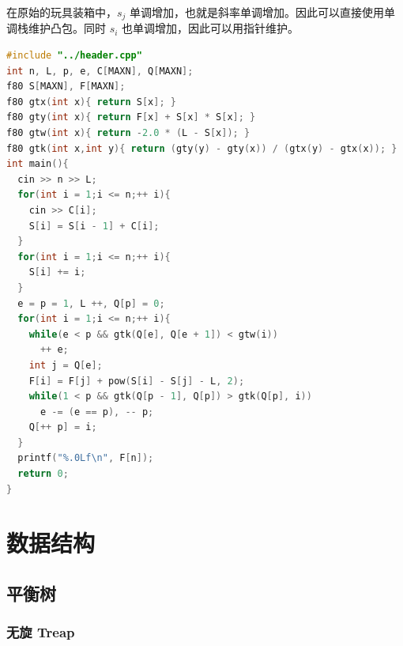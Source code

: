 \documentclass[10pt]{ctexart}
\begin{document}
\begin{multicols}{3}
    在原始的玩具装箱中，\(s_j\)
    单调增加，也就是斜率单调增加。因此可以直接使用单调栈维护凸包。同时
    \(s_i\) 也单调增加，因此可以用指针维护。

\begin{lstlisting}[language={C++}]
#include "../header.cpp"
int n, L, p, e, C[MAXN], Q[MAXN];
f80 S[MAXN], F[MAXN];
f80 gtx(int x){ return S[x]; }
f80 gty(int x){ return F[x] + S[x] * S[x]; }
f80 gtw(int x){ return -2.0 * (L - S[x]); }
f80 gtk(int x,int y){ return (gty(y) - gty(x)) / (gtx(y) - gtx(x)); }
int main(){ 
  cin >> n >> L;
  for(int i = 1;i <= n;++ i){
    cin >> C[i];
    S[i] = S[i - 1] + C[i];
  }
  for(int i = 1;i <= n;++ i){
    S[i] += i;
  }
  e = p = 1, L ++, Q[p] = 0;
  for(int i = 1;i <= n;++ i){
    while(e < p && gtk(Q[e], Q[e + 1]) < gtw(i))
      ++ e;
    int j = Q[e];
    F[i] = F[j] + pow(S[i] - S[j] - L, 2);
    while(1 < p && gtk(Q[p - 1], Q[p]) > gtk(Q[p], i))
      e -= (e == p), -- p;
    Q[++ p] = i;
  }
  printf("%.0Lf\n", F[n]);
  return 0;
}
\end{lstlisting}

    \section{数据结构}\label{ux6570ux636eux7ed3ux6784}

    \subsection{平衡树}\label{ux5e73ux8861ux6811}

    \subsubsection{无旋 Treap}\label{ux65e0ux65cb-treap}


\end{multicols}
\end{document}
